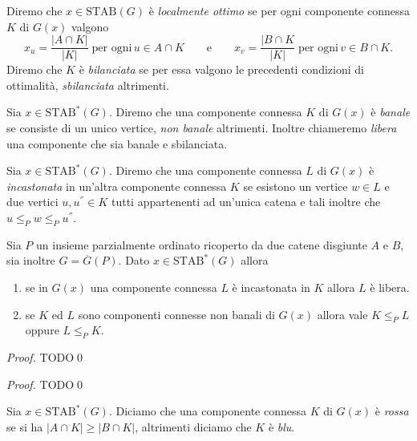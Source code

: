 \begin{definition}
	Diremo che \(x\in\text{STAB}(G)\) è \emph{localmente ottimo} se per ogni componente connessa \(K\) di \(G(x)\) valgono
	\[x_u=\frac{|A\cap K|}{|K|}\;\text{per ogni}\,u\in A\cap K\qquad\text{e}\qquad x_v=\frac{|B\cap K}{|K|}\;\text{per ogni}\,v\in B\cap K.\]
	Diremo che \(K\) è \emph{bilanciata} se per essa valgono le precedenti condizioni di ottimalità, \emph{sbilanciata} altrimenti. 
\end{definition}
\begin{definition}
	Sia \(x\in\text{STAB}^*(G)\). Diremo che una componente connessa \(K\) di \(G(x)\) è \emph{banale} se consiste di un unico vertice, \emph{non banale} altrimenti. Inoltre chiameremo \emph{libera} una componente che sia banale e sbilanciata. 
\end{definition}
\begin{definition}
	Sia \(x\in\text{STAB}^{*}(G)\). Diremo che una componente connessa \(L\) di \(G(x)\) è \emph{incastonata} in un'altra componente connessa \(K\) se esistono un vertice \(w\in L\) e due vertici \(u,u^{''}\in K\) tutti appartenenti ad un'unica catena e tali inoltre che \(u\le_{P}w\le_{P}u^{''}\). 
\end{definition}
\begin{lemma}
	\label{inlaylemma} Sia \(P\) un insieme parzialmente ordinato ricoperto da due catene disgiunte \(A\) e \(B\), sia inoltre \(G=\overline{G}(P)\). Dato \(x\in\text{STAB}^{*}(G)\) allora 
	\begin{enumerate}
		\item se in \(G(x)\) una componente connessa \(L\) è incastonata in \(K\) allora \(L\) è libera. 
		\item se \(K\) ed \(L\) sono componenti connesse non banali di \(G(x)\) allora vale \(K\le_{P}L\) oppure \(L\le_{P}K\). 
	\end{enumerate}
\end{lemma}
\begin{proof}
	TODO\qed 
\end{proof}
\begin{lemma}
	\label{touchinglemma} 
\end{lemma}
\begin{proof}
	TODO\qed 
\end{proof}
\begin{definition}
	Sia \(x\in\text{STAB}^{*}(G)\). Diciamo che una componente connessa \(K\) di \(G(x)\) è \emph{rossa} se si ha \(|A\cap K|\ge|B\cap K|\), altrimenti diciamo che \(K\) è \emph{blu}. 
\end{definition}
